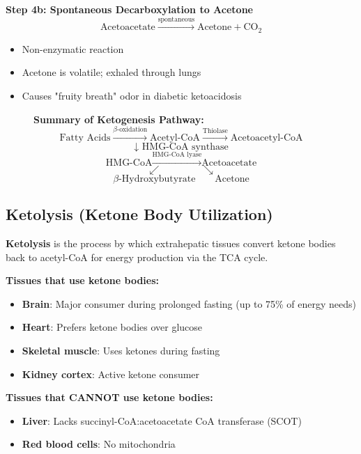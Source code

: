 \textbf{Step 4b: Spontaneous Decarboxylation to Acetone}
\[
\text{Acetoacetate} \xrightarrow{\text{spontaneous}} \text{Acetone} + \text{CO}_2
\]
\begin{itemize}
    \item Non-enzymatic reaction
    \item Acetone is volatile; exhaled through lungs
    \item Causes "fruity breath" odor in diabetic ketoacidosis
\end{itemize}

\begin{figure}[h]
\centering
\begin{tcolorbox}[colback=white, colframe=black, width=0.9\textwidth]
\textbf{Summary of Ketogenesis Pathway:}
\[
\text{Fatty Acids} \xrightarrow{\beta\text{-oxidation}} \text{Acetyl-CoA} \xrightarrow{\text{Thiolase}} \text{Acetoacetyl-CoA}
\]
\[
\downarrow \text{ HMG-CoA synthase}
\]
\[
\text{HMG-CoA} \xrightarrow{\text{HMG-CoA lyase}} \text{Acetoacetate}
\]
\[
\swarrow \qquad \qquad \searrow
\]
\[
\beta\text{-Hydroxybutyrate} \qquad \text{Acetone}
\]
\end{tcolorbox}
\end{figure}

\subsection{Ketolysis (Ketone Body Utilization)}

\begin{definition}
\textbf{Ketolysis} is the process by which extrahepatic tissues convert ketone bodies back to acetyl-CoA for energy production via the TCA cycle.
\end{definition}

\textbf{Tissues that use ketone bodies:}
\begin{itemize}
    \item \textbf{Brain}: Major consumer during prolonged fasting (up to 75\% of energy needs)
    \item \textbf{Heart}: Prefers ketone bodies over glucose
    \item \textbf{Skeletal muscle}: Uses ketones during fasting
    \item \textbf{Kidney cortex}: Active ketone consumer
\end{itemize}

\textbf{Tissues that CANNOT use ketone bodies:}
\begin{itemize}
    \item \textbf{Liver}: Lacks succinyl-CoA:acetoacetate CoA transferase (SCOT)
    \item \textbf{Red blood cells}: No mitochondria
\end{itemize}

